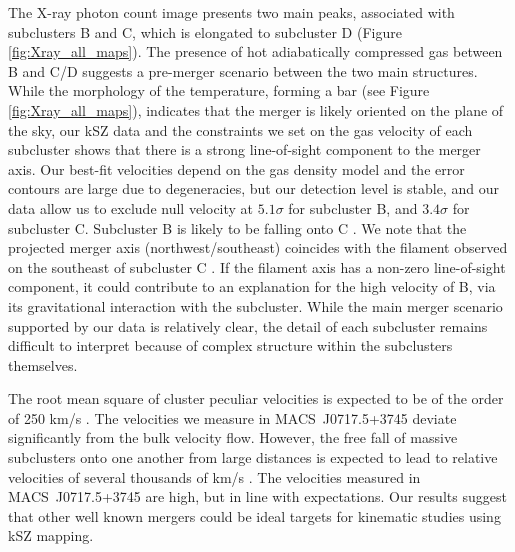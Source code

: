 \documentclass[twocolumn,traditabstract]{aa}
\begin{document}
The X-ray photon count image presents two main peaks, associated with subclusters B and C, which is elongated to subcluster D (Figure \ref{fig:Xray_all_maps}). The presence of hot adiabatically compressed gas between B and C/D suggests a pre-merger scenario between the two main structures. While the morphology of the temperature, forming a bar (see Figure \ref{fig:Xray_all_maps}), indicates that the merger is likely oriented on the plane of the sky, our kSZ data and the constraints we set on the gas velocity of each subcluster shows that there is a strong line-of-sight component to the merger axis. Our best-fit velocities depend on the gas density model and the error contours are large due to degeneracies, but our detection level is stable, and our data allow us to exclude null velocity at $5.1 \sigma$ for subcluster B, and $3.4 \sigma$ for subcluster C. Subcluster B is likely to be falling onto C \citep[the most massive of the subclusters, e.g.,][]{Limousin2015}. We note that the projected merger axis (northwest/southeast) coincides with the filament observed on the southeast of subcluster C \citep[e.g.,][]{Medezinski2013}. If the filament axis has a non-zero line-of-sight component, it could contribute to an explanation for the high velocity of B, via its gravitational interaction with the subcluster. While the main merger scenario supported by our data is relatively clear, the detail of each subcluster remains difficult to interpret because of complex structure within the subclusters themselves.

The root mean square of cluster peculiar velocities is expected to be of the order of 250 km/s \citep[e.g.,][]{Monteagudo2010}. The velocities we measure in \mbox{MACS~J0717.5+3745} deviate significantly from the bulk velocity flow. However, the free fall of massive subclusters onto one another from large distances is expected to lead to relative velocities of several thousands of km/s \citep{Sarazin2002}. The velocities measured in \mbox{MACS~J0717.5+3745} are high, but in line with expectations. Our results suggest that other well known mergers could be ideal targets for kinematic studies using kSZ mapping.
\end{document}
